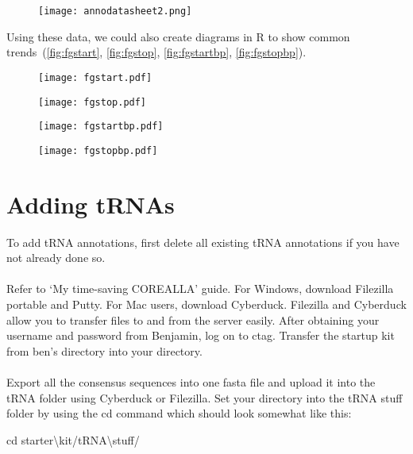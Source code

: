 \documentclass[11pt]{article}
\begin{document}
\begin{figure}[H]
  \centering
    \texttt{[image: annodatasheet2.png]}
  \label{fig:annodatasheet2}
\end{figure}
\hfill \break

Using these data, we could also create diagrams in R to show common trends~(\autoref{fig:fgstart}, \autoref{fig:fgstop}, \autoref{fig:fgstartbp}, \autoref{fig:fgstopbp}).

\begin{figure}[H]
  \centering
    \texttt{[image: fgstart.pdf]}
  \label{fig:fgstart}
\end{figure}

\begin{figure}[H]
  \centering
    \texttt{[image: fgstop.pdf]}
  \label{fig:fgstop}
\end{figure}

\begin{figure}[H]
  \centering
    \texttt{[image: fgstartbp.pdf]}
  \label{fig:fgstartbp}
\end{figure}

\begin{figure}[H]
  \centering
    \texttt{[image: fgstopbp.pdf]}
  \label{fig:fgstopbp}
\end{figure}

\newpage
\section{Adding tRNAs}
\label{sec:Adding}
To add tRNA annotations, first delete all existing tRNA annotations if you have not already done so. 
\\
\\
Refer to `My time-saving COREALLA' guide. For Windows, download Filezilla portable and Putty. For Mac users, download Cyberduck. Filezilla and Cyberduck allow you to transfer files to and from the server easily. After obtaining your username and password from Benjamin, log on to ctag. Transfer the startup kit from ben's directory into your directory. 
\\
\\
Export all the consensus sequences into one fasta file and upload it into the tRNA folder using Cyberduck or Filezilla. Set your directory into the tRNA stuff folder by using the cd command which should look somewhat like this:
\begin{displayquote}
cd starter\textbackslash kit/tRNA\textbackslash stuff/ \\
\end{displayquote}
\end{document}
